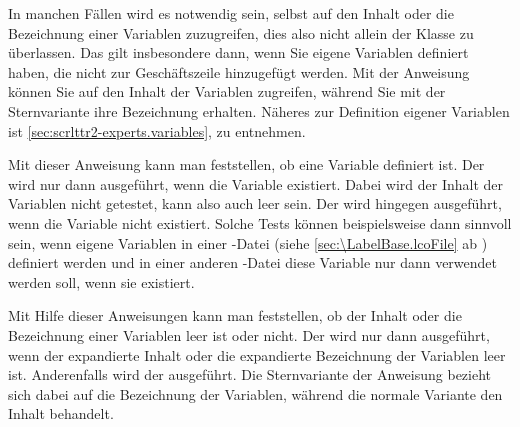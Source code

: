 \begin{Declaration}
\end{Declaration}
In manchen Fällen wird es notwendig sein,
selbst auf den Inhalt oder die Bezeichnung einer Variablen zuzugreifen, dies
also nicht allein der Klasse zu überlassen. Das gilt insbesondere dann, wenn
Sie eigene Variablen definiert haben, die nicht zur Geschäftszeile
hinzugefügt werden.  Mit der Anweisung  können Sie auf den
Inhalt der Variablen  zugreifen, während Sie mit der Sternvariante
 ihre Bezeichnung erhalten. Näheres zur Definition eigener
Variablen ist \autoref{sec:scrlttr2-experts.variables},
 zu entnehmen.%
\EndIndexGroup


\begin{Declaration}
\end{Declaration}
Mit%
 dieser Anweisung
kann man feststellen, ob eine Variable definiert ist. Der 
wird nur dann ausgeführt, wenn die Variable existiert. Dabei wird der Inhalt
der Variablen nicht getestet, kann also auch leer sein. Der 
wird hingegen ausgeführt, wenn die Variable nicht existiert. Solche Tests
können beispielsweise dann sinnvoll sein, wenn eigene Variablen in einer
-Datei (siehe
\autoref{sec:\LabelBase.lcoFile} ab )
definiert werden und in einer anderen -Datei diese Variable nur dann
verwendet werden soll, wenn sie existiert.  \EndIndexGroup


\begin{Declaration}
\end{Declaration}
Mit%
 Hilfe dieser
Anweisungen kann man feststellen, ob der Inhalt oder die Bezeichnung einer
Variablen leer ist oder nicht. Der  wird nur dann ausgeführt,
wenn der expandierte Inhalt oder die expandierte Bezeichnung der Variablen
 leer ist. Anderenfalls wird der  ausgeführt.
Die Sternvariante der Anweisung bezieht sich dabei auf die Bezeichnung der
Variablen, während die normale Variante den Inhalt behandelt.%
\EndIndexGroup
%
\EndIndexGroup


